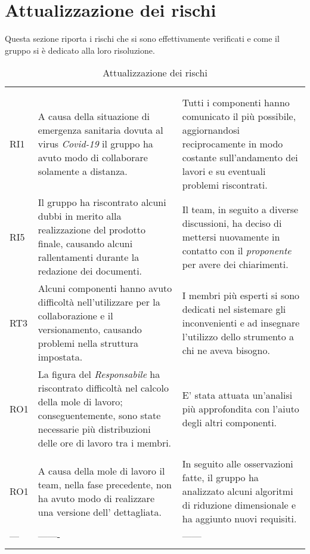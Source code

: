\section{Attualizzazione dei rischi}

Questa sezione riporta i rischi che si sono effettivamente verificati e come il gruppo si è dedicato alla loro risoluzione.


\begin{longtable}{C{2.5cm} C{7cm} C{7cm}} 
 	 &
 	 &
 	 \\
 	
 	 \\
 	
 	RI1 & A causa della situazione di emergenza sanitaria dovuta al virus \textit{Covid-19} il gruppo ha avuto modo di collaborare solamente a distanza. & Tutti i componenti hanno comunicato il più possibile, aggiornandosi reciprocamente in modo costante sull'andamento dei lavori e su eventuali problemi riscontrati. \\
 	RI5 & Il gruppo ha riscontrato alcuni dubbi in merito alla realizzazione del prodotto finale, causando alcuni rallentamenti durante la redazione dei documenti. & Il team, in seguito a diverse discussioni, ha deciso di mettersi nuovamente in contatto con il \textit{proponente} per avere dei chiarimenti. \\
 	RT3 & Alcuni componenti hanno avuto difficoltà nell'utilizzare  per la collaborazione e il versionamento, causando problemi nella struttura impostata. & I membri più esperti si sono dedicati nel sistemare gli inconvenienti e ad insegnare l'utilizzo dello strumento a chi ne aveva bisogno. \\
 	RO1 & La figura del \textit{Responsabile} ha riscontrato difficoltà nel calcolo della mole di lavoro; conseguentemente, sono state necessarie più distribuzioni delle ore di lavoro tra i membri. & E' stata attuata un'analisi più approfondita con l'aiuto degli altri componenti. \\
 		
 	 \\
 	
 	RO1 & A causa della mole di lavoro il team, nella fase precedente, non ha avuto modo di realizzare una versione dell'\AdRv{} dettagliata. &  In seguito alle osservazioni fatte, il gruppo ha analizzato alcuni algoritmi di riduzione dimensionale e ha aggiunto nuovi requisiti. \\
 	
 	--- & ------- &  ------ \\	 	
 	
 	\caption{Attualizzazione dei rischi}
 	
\end{longtable}